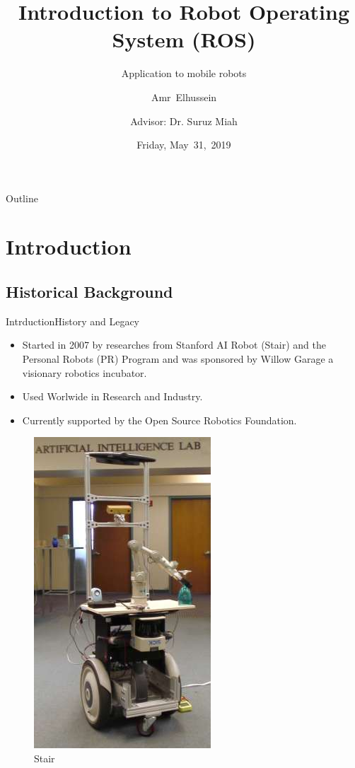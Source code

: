 \documentclass{beamer}
\title[Intro to ROS]{Introduction to Robot Operating System (ROS)}
\subtitle{Application to mobile robots}
\author[A.Elhussein]{Amr~Elhussein  \\\and
Advisor: Dr. Suruz Miah}
\institute[Bradley University] %
{
  Department of Electrical and Computer Engineering\\
  Bradley University\\
  1501 W. Bradley Avenue\\
  Peoria, IL, 61625, USA
}
\date[May~31,~2019]{Friday, May~31,~2019}
\begin{document}
\begin{frame}
  \titlepage
\end{frame}

\begin{frame}{Outline}
  \tableofcontents
\end{frame}


\section{Introduction}
\subsection{Historical Background}
\begin{frame}{Intrduction}{History and Legacy}
  
\begin{itemize}
  \item
   Started in 2007 by researches from Stanford AI Robot (Stair) and the Personal Robots (PR) Program and was sponsored by Willow Garage a visionary robotics incubator.
  \item
Used Worlwide in Research and Industry.
  \item
    Currently supported by the Open Source Robotics Foundation.
  \end{itemize}
  \begin{figure}
  \includegraphics[scale=0.2]{figs/img/stair_small}
  \caption{Stair}
  \end{figure}
  
\end{frame}
\end{document}
